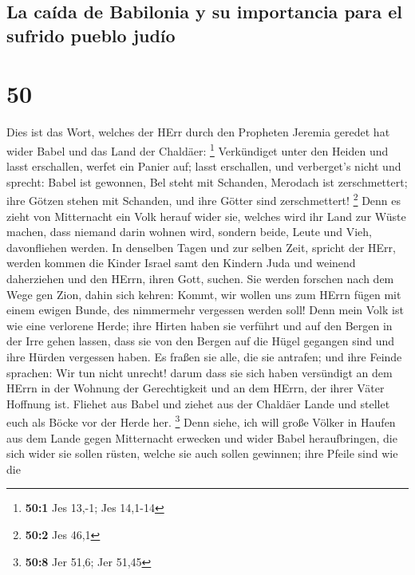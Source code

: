 \hypertarget{la-cauxedda-de-babilonia-y-su-importancia-para-el-sufrido-pueblo-juduxedo}{%
\subsection{La caída de Babilonia y su importancia para el sufrido
pueblo
judío}\label{la-cauxedda-de-babilonia-y-su-importancia-para-el-sufrido-pueblo-juduxedo}}

\hypertarget{section-49}{%
\section{50}\label{section-49}}

 Dies ist das Wort, welches der HErr durch den Propheten
Jeremia geredet hat wider Babel und das Land der Chaldäer: \footnote{\textbf{50:1}
  Jes 13,-1; Jes 14,1-14}  Verkündiget unter den Heiden
und lasst erschallen, werfet ein Panier auf; lasst erschallen, und
verberget's nicht und sprecht: Babel ist gewonnen, Bel steht mit
Schanden, Merodach ist zerschmettert; ihre Götzen stehen mit Schanden,
und ihre Götter sind zerschmettert! \footnote{\textbf{50:2} Jes 46,1}
 Denn es zieht von Mitternacht ein Volk herauf wider sie,
welches wird ihr Land zur Wüste machen, dass niemand darin wohnen wird,
sondern beide, Leute und Vieh, davonfliehen werden.  In
denselben Tagen und zur selben Zeit, spricht der HErr, werden kommen die
Kinder Israel samt den Kindern Juda und weinend daherziehen und den
HErrn, ihren Gott, suchen.  Sie werden forschen nach dem
Wege gen Zion, dahin sich kehren: Kommt, wir wollen uns zum HErrn fügen
mit einem ewigen Bunde, des nimmermehr vergessen werden soll!
 Denn mein Volk ist wie eine verlorene Herde; ihre Hirten
haben sie verführt und auf den Bergen in der Irre gehen lassen, dass sie
von den Bergen auf die Hügel gegangen sind und ihre Hürden vergessen
haben.  Es fraßen sie alle, die sie antrafen; und ihre
Feinde sprachen: Wir tun nicht unrecht! darum dass sie sich haben
versündigt an dem HErrn in der Wohnung der Gerechtigkeit und an dem
HErrn, der ihrer Väter Hoffnung ist.  Fliehet aus Babel
und ziehet aus der Chaldäer Lande und stellet euch als Böcke vor der
Herde her. \footnote{\textbf{50:8} Jer 51,6; Jer 51,45} 
Denn siehe, ich will große Völker in Haufen aus dem Lande gegen
Mitternacht erwecken und wider Babel heraufbringen, die sich wider sie
sollen rüsten, welche sie auch sollen gewinnen; ihre Pfeile sind wie die

